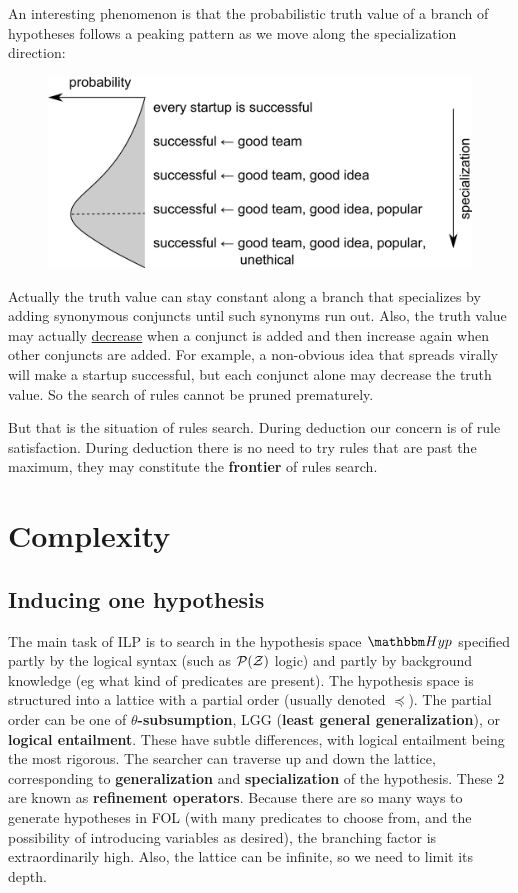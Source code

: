 An interesting phenomenon is that the probabilistic truth value of a branch of hypotheses follows a peaking pattern as we move along the specialization direction:
\begin{figure}[H]
\centering
\includegraphics[scale=1]{subsumption-peaking.png}
\end{figure}
Actually the truth value can stay constant along a branch that specializes by adding synonymous conjuncts until such synonyms run out.  Also, the truth value may actually \underline{decrease} when a conjunct is added and then increase again when other conjuncts are added.  For example, a non-obvious idea that spreads virally will make a startup successful, but each conjunct alone may decrease the truth value.  So the search of rules cannot be pruned prematurely.

But that is the situation of rules search.  During deduction our concern is of rule satisfaction.  During deduction there is no need to try rules that are past the maximum, they may constitute the \textbf{frontier} of rules search.

\section{Complexity}

\subsection{Inducing one hypothesis}

The main task of ILP is to search in the hypothesis space $\Hyp$ specified partly by the logical syntax (such as $\mathcal{P(Z)}$ logic) and partly by background knowledge (eg what kind of predicates are present).  The hypothesis space is structured into a lattice with a partial order (usually denoted $ \preceq $).  The partial order can be one of \textbf{$\theta$-subsumption}, LGG (\textbf{least general generalization}), or \textbf{logical entailment}.  These have subtle differences, with logical entailment being the most rigorous.  The searcher can traverse up and down the lattice, corresponding to \textbf{generalization} and \textbf{specialization} of the hypothesis.  These 2 are known as \textbf{refinement operators}.  Because there are so many ways to generate hypotheses in FOL (with many predicates to choose from, and the possibility of introducing variables as desired), the branching factor is extraordinarily high.  Also, the lattice can be infinite, so we need to limit its depth.

